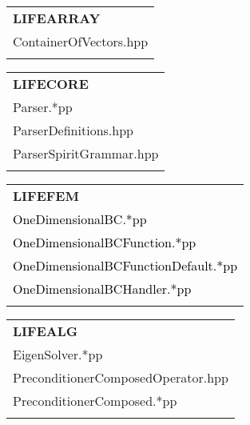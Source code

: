 \documentclass[10p]{article}
\newcommand{\newpartsVC}[1]{\textcolor{black}{#1}}
\theoremstyle{definition}
\begin{document}
\begin{landscape}
\begin{table}[!h]
\begin{multicols}{3}
\begin{xtabular}{
p{0.36\textwidth}<{}
}
\\
\end{xtabular}
\begin{xtabular}{
p{0.36\textwidth}<{}
}
\textbf{LIFEARRAY} \\
ContainerOfVectors.hpp\\
\\
\end{xtabular}
\begin{xtabular}{
p{0.36\textwidth}<{}
}
\textbf{LIFECORE} \\
Parser.*pp\\
ParserDefinitions.hpp\\
ParserSpiritGrammar.hpp\\
\\
\end{xtabular}
\begin{xtabular}{
p{0.36\textwidth}<{}
}
\textbf{LIFEFEM} \\
\newpartsVC{OneDimensionalBC.*pp}\\
\newpartsVC{OneDimensionalBCFunction.*pp}\\
\newpartsVC{OneDimensionalBCFunctionDefault.*pp}\\
\newpartsVC{OneDimensionalBCHandler.*pp}\\
\\
\end{xtabular}
\begin{xtabular}{
p{0.36\textwidth}<{}
}
\textbf{LIFEALG} \\
EigenSolver.*pp\\
PreconditionerComposedOperator.hpp\\
PreconditionerComposed.*pp\\
\\
\end{xtabular}
\end{multicols}
\normalsize\selectfont
\end{table}
\end{landscape}




\newpage
\end{document}
